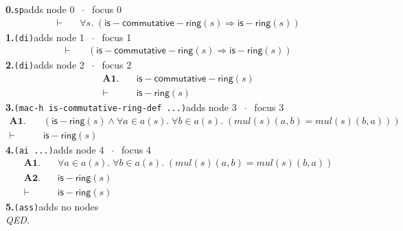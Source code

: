 \documentclass[11pt]{article}
\begin{document}
\medskip\noindent\textbf{0.}\quad \texttt{sp}\hfill{\small adds node 0 $\;\cdot\;$ focus 0}\\[2pt]
\begin{align*}
  \vdash\quad & \forall s.\; (\mathsf{is{-}commutative{-}ring}(s) \Rightarrow \mathsf{is{-}ring}(s))
\end{align*}
\medskip\noindent\textbf{1.}\quad \texttt{(di)}\hfill{\small adds node 1 $\;\cdot\;$ focus 1}\\[2pt]
\begin{align*}
  \vdash\quad & (\mathsf{is{-}commutative{-}ring}(s) \Rightarrow \mathsf{is{-}ring}(s))
\end{align*}
\medskip\noindent\textbf{2.}\quad \texttt{(di)}\hfill{\small adds node 2 $\;\cdot\;$ focus 2}\\[2pt]
\begin{align*}
  \mathbf{A1.}\quad & \mathsf{is{-}commutative{-}ring}(s) \\
  \vdash\quad & \mathsf{is{-}ring}(s)
\end{align*}
\medskip\noindent\textbf{3.}\quad \texttt{(mac-h is-commutative-ring-def ...)}\hfill{\small adds node 3 $\;\cdot\;$ focus 3}\\[2pt]
\begin{align*}
  \mathbf{A1.}\quad & (\mathsf{is{-}ring}(s) \wedge \forall a \in a(s).\; \forall b \in a(s).\; (\mathit{mul}(s)(a, b) = \mathit{mul}(s)(b, a))) \\
  \vdash\quad & \mathsf{is{-}ring}(s)
\end{align*}
\medskip\noindent\textbf{4.}\quad \texttt{(ai ...)}\hfill{\small adds node 4 $\;\cdot\;$ focus 4}\\[2pt]
\begin{align*}
  \mathbf{A1.}\quad & \forall a \in a(s).\; \forall b \in a(s).\; (\mathit{mul}(s)(a, b) = \mathit{mul}(s)(b, a)) \\
  \mathbf{A2.}\quad & \mathsf{is{-}ring}(s) \\
  \vdash\quad & \mathsf{is{-}ring}(s)
\end{align*}
\medskip\noindent\textbf{5.}\quad \texttt{(ass)}\hfill{\small adds no nodes}\\[2pt]
\emph{QED.}\par
\end{document}
